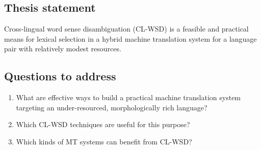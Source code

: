 
\subsection{Thesis statement}
Cross-lingual word sense disambiguation (CL-WSD) is a feasible and practical
means for lexical selection in a hybrid machine translation system for a
language pair with relatively modest resources.

\subsection{Questions to address}
\begin{enumerate}
\item What are effective ways to build a practical machine translation system
targeting an under-resourced, morphologically rich language?
\item Which CL-WSD techniques are useful for this purpose?
\item Which kinds of MT systems can benefit from CL-WSD?
\end{enumerate}
